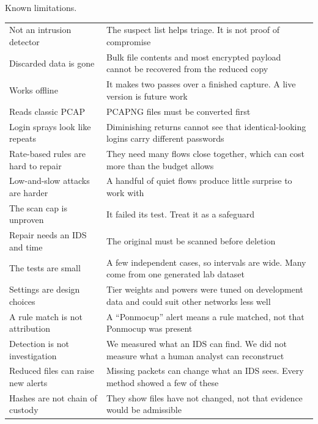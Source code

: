 \begin{gtable}{Known limitations.}
\begin{tabularx}{\linewidth}{l L}
\toprule
{} & \\
\midrule
Not an intrusion detector & The suspect list helps triage. It is not proof of compromise\\
Discarded data is gone & Bulk file contents and most encrypted payload cannot be recovered from the reduced copy\\
Works offline & It makes two passes over a finished capture. A live version is future work\\
Reads classic PCAP & PCAPNG files must be converted first\\
Login sprays look like repeats & Diminishing returns cannot see that identical-looking logins carry different passwords\\
Rate-based rules are hard to repair & They need many flows close together, which can cost more than the budget allows\\
Low-and-slow attacks are harder & A handful of quiet flows produce little surprise to work with\\
The scan cap is unproven & It failed its test. Treat it as a safeguard\\
Repair needs an IDS and time & The original must be scanned before deletion\\
The tests are small & A few independent cases, so intervals are wide. Many come from one generated lab dataset\\
Settings are design choices & Tier weights and powers were tuned on development data and could suit other networks less well\\
A rule match is not attribution & A ``Ponmocup'' alert means a rule matched, not that Ponmocup was present\\
Detection is not investigation & We measured what an IDS can find. We did not measure what a human analyst can reconstruct\\
Reduced files can raise new alerts & Missing packets can change what an IDS sees. Every method showed a few of these\\
Hashes are not chain of custody & They show files have not changed, not that evidence would be admissible\\
\bottomrule
\end{tabularx}
\end{gtable}

